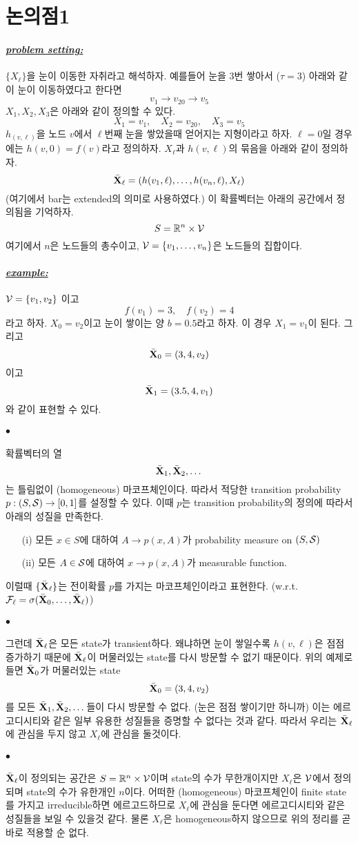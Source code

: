 \documentclass[12pt,oneside,english,a4paper]{article}
\def\ck{\paragraph{\large$\bullet$}\large}
\newcommand{\para}[1]{\paragraph{\large\it\underline{\textbf{#1:}}}\large}
\newcommand{\bfX}{\mbox{$\bf{X}$}}
\begin{document}
\section{논의점1}
\para{problem setting} $\{X_\ell\}$을 눈이 이동한 자취라고 해석하자. 예를들어 눈을 3번 쌓아서 ($\tau=3$) 아래와 같이 눈이 이동하였다고 한다면 
\[
v_1 \to v_{20} \to v_{5}
\]
$X_1,X_2,X_3$은 아래와 같이 정의할 수 있다. 
\[
X_1=v_1, \quad X_2=v_{20}, \quad X_{3}=v_5
\]
$h_(v,\ell)$을 노드 $v$에서 $\ell$번째 눈을 쌓았을때 얻어지는 지형이라고 하자. $\ell=0$일 경우에는 $h(v,0)=f(v)$라고 정의하자. $X_\ell$과 $h(v,\ell)$의 묶음을 아래와 같이 정의하자. 
\[
\bar{\bfX}_\ell=(h(v_1,\ell),\dots,h(v_n,\ell),X_\ell)
\]
(여기에서 bar는 extended의 의미로 사용하였다.) 이 확률벡터는 아래의 공간에서 정의됨을 기억하자. 
\[
S=\mathbb{R}^n \times {\cal V}
\]
여기에서 $n$은 노드들의 총수이고, ${\cal V}=\{v_1,\dots,v_n\}$은 노드들의 집합이다.

\para{example} ${\cal V}=\{v_1,v_2\}$ 이고 
\[
f(v_1)=3, \quad f(v_2)=4
\]
라고 하자. $X_0=v_2$이고 눈이 쌓이는 양 $b=0.5$라고 하자. 이 경우 $X_1=v_1$이 된다. 그리고 
\[
\bar{\bfX}_0=(3,4,v_2)
\]
이고 
\[
\bar{\bfX}_1=(3.5,4,v_1)
\]
와 같이 표현할 수 있다. 
\ck 
확률벡터의 열 
\[
\bar{\bfX}_1, \bar{\bfX}_2, \dots
\]
는 틀림없이 (homogeneous) 마코프체인이다. 따라서 적당한 transition probability $p:(S,{\cal S})\to [0,1]$를 설정할 수 있다. 
이때 $p$는 transition probability의 정의에 따라서 아래의 성질을 만족한다. 
\begin{itemize}
	\item[(i)] 모든 $x \in S$에 대하여 $A \to p(x,A)$가 probability measure on $(S,{\cal S})$
	\item[(ii)] 모든 $A \in {\cal S}$에 대하여 $x \to p(x,A)$가 measurable function. 
\end{itemize} 
이럴때 $\{\bar{\bfX}_\ell\}$는 전이확률 $p$를 가지는 마코프체인이라고 표현한다. (w.r.t. ${\cal F}_\ell=\sigma(\bar{\bfX}_0,\dots,\bar{\bfX}_\ell)$)

\ck 그런데 $\bar{\bfX}_\ell$은 모든 state가 transient하다. 왜냐하면 눈이 쌓일수록 $h(v,\ell)$은 점점 증가하기 때문에 $\bar{\bfX}_\ell$이 머물러있는 state를 다시 방문할 수 없기 때문이다. 위의 예제로 들면 $\bar{\bfX}_0$가 머물러있는 state
\[
\bar{\bfX}_0=(3,4,v_2)
\]
를 모든 $\bar{\bfX}_1,\bar{\bfX}_2,\dots$들이 다시 방문할 수 없다. (눈은 점점 쌓이기만 하니까) 이는 에르고디시티와 같은 일부 유용한 성질들을 증명할 수 없다는 것과 같다. 따라서 우리는 $\bar{\bfX}_\ell$에 관심을 두지 않고 $X_\ell$에 관심을 둘것이다. 

\ck $\bar{\bfX}_\ell$이 정의되는 공간은 $S=\mathbb{R}^n\times {\cal V}$이며 state의 수가 무한개이지만 $X_\ell$은 ${\cal V}$에서 정의되며 state의 수가 유한개인 $n$이다. 어떠한 (homogeneous) 마코프체인이 finite state를 가지고 irreducible하면 에르고드하므로 $X_\ell$에 관심을 둔다면 에르고디시티와 같은 성질들을 보일 수 있을것 같다. 물론 $X_\ell$은 homogeneous하지 않으므로 위의 정리를 곧바로 적용할 순 없다. 
\end{document}

